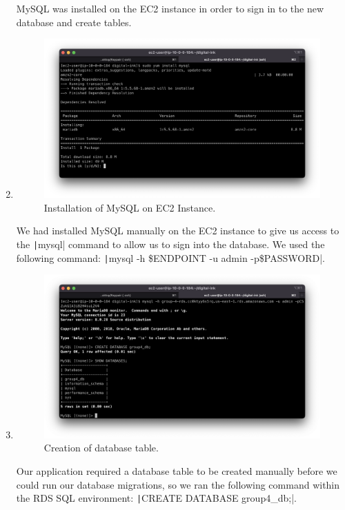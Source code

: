 \begin{enumerate}
    MySQL was installed on the EC2 instance in order to sign in to the new database and create tables.

    \item
    \begin{figure}[H]
    \centering
    \includegraphics[width=\textwidth]{resources/rds/rds-mysql-install}
    \caption{Installation of MySQL on EC2 Instance.}
    \label{fig:rds-msql-install}
    \end{figure}
    We had installed MySQL manually on the EC2 instance to give us access to the \texttt|mysql| command to allow us to sign into the database. We used the following command: \texttt|mysql -h \$ENDPOINT -u admin -p\$PASSWORD|.

    \item
    \begin{figure}[H]
    \centering
    \includegraphics[width=\textwidth]{resources/rds/rds-database-creation}
    \caption{Creation of database table.}
    \label{fig:rds-db-create-2}
    \end{figure}
    Our application required a database table to be created manually before we could run our database migrations, so we ran the following command within the RDS SQL environment: \texttt|CREATE DATABASE group4_db;|.


\end{enumerate}
